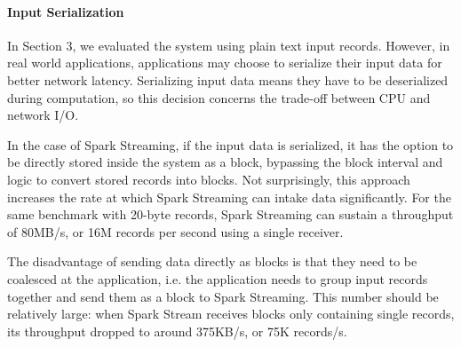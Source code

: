 \paragraph{Input Serialization}
In Section 3, we evaluated the system using plain text input records. However, in real world applications, applications may choose to serialize their input data for better network latency. Serializing input data means they have to be deserialized during computation, so this decision concerns the trade-off between CPU and network I/O.

In the case of Spark Streaming, if the input data is serialized, it has the option to be directly stored inside the system as a block, bypassing the block interval and logic to convert stored records into blocks. Not surprisingly, this approach increases the rate at which Spark Streaming can intake data significantly. For the same benchmark with 20-byte records, Spark Streaming can sustain a throughput of 80MB/s, or 16M records per second using a single receiver.

The disadvantage of sending data directly as blocks is that they need to be coalesced at the application, i.e. the application needs to group input records together and send them as a block to Spark Streaming. This number should be relatively large: when Spark Stream receives blocks only containing single records, its throughput dropped to around 375KB/s, or 75K records/s.




